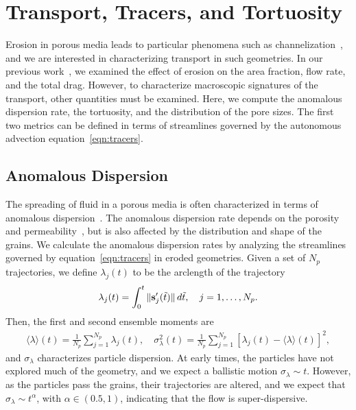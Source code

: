 \documentclass{jfm}
\begin{document}
\section{Transport, Tracers, and Tortuosity}
\label{sec:transport}
Erosion in porous media leads to particular phenomena such as
channelization~\citep{berhanu2012shape}, and we are interested in
characterizing transport in such geometries.  In our previous
work~\citep{qua-moo2018}, we examined the effect of erosion on the area
fraction, flow rate, and the total drag.  However, to characterize
macroscopic signatures of the transport, other quantities must be
examined.  Here, we compute the anomalous dispersion rate, the
tortuosity, and the distribution of the pore sizes.  The first two
metrics can be defined in terms of streamlines governed by the
autonomous advection equation~\eqref{eqn:tracers}.

\subsection{Anomalous Dispersion}
\label{sec:dispersion}
The spreading of fluid in a porous media is often characterized in terms
of anomalous dispersion~\citep{kla-rad-sok2008, den-cor-sch-ber2004}.
The anomalous dispersion rate depends on the porosity and
permeability~\citep{koc-bra1988}, but is also affected by the
distribution and shape of the grains. We calculate the anomalous
dispersion rates by analyzing the streamlines governed by
equation~\eqref{eqn:tracers} in eroded geometries. Given a set of $N_p$
trajectories, we define $\lambda_j(t)$ to be the arclength of the
trajectory
\begin{align}
  \lambda_j(t) = \int_{0}^t \|\ss'_j(\tilde{t})\|\, d\tilde{t}, 
    \quad j=1,\ldots,N_p.
\end{align}
Then, the first and second ensemble moments are
\begin{align}
  \label{eqn:moments}
  \langle \lambda \rangle (t) = 
    \frac{1}{N_p} \sum_{j=1}^{N_p} \lambda_j(t), \quad 
    \sigma_\lambda^2(t) = \frac{1}{N_p} \sum_{j=1}^{N_p}
    \left[\lambda_j(t) - \langle \lambda \rangle(t) \right]^2,
\end{align}
and $\sigma_\lambda$ characterizes particle dispersion.  At early times,
the particles have not explored much of the geometry, and we expect a
ballistic motion $\sigma_\lambda \sim t$.  However, as the particles
pass the grains, their trajectories are altered, and we expect that
$\sigma_\lambda \sim t^\alpha$, with $\alpha \in (0.5,1)$, indicating
that the flow is super-dispersive.
\end{document}
